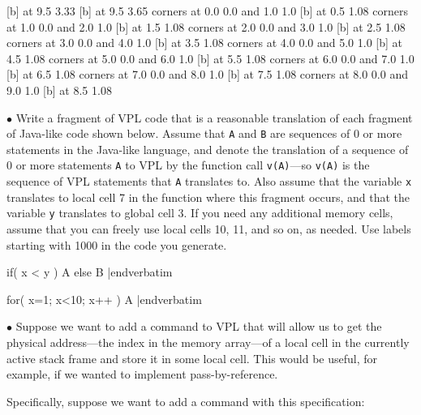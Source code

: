  [b] at 9.5 3.33
 [b] at 9.5 3.65
\putrectangle corners at 0.0 0.0 and 1.0 1.0
 [b] at 0.5 1.08
\putrectangle corners at 1.0 0.0 and 2.0 1.0
 [b] at 1.5 1.08
\putrectangle corners at 2.0 0.0 and 3.0 1.0
 [b] at 2.5 1.08
\putrectangle corners at 3.0 0.0 and 4.0 1.0
 [b] at 3.5 1.08
\putrectangle corners at 4.0 0.0 and 5.0 1.0
 [b] at 4.5 1.08
\putrectangle corners at 5.0 0.0 and 6.0 1.0
 [b] at 5.5 1.08
\putrectangle corners at 6.0 0.0 and 7.0 1.0
 [b] at 6.5 1.08
\putrectangle corners at 7.0 0.0 and 8.0 1.0
 [b] at 7.5 1.08
\putrectangle corners at 8.0 0.0 and 9.0 1.0
 [b] at 8.5 1.08
\endpicture

\vfil\eject

\item{$\bullet$}
Write a fragment of VPL code that is a reasonable translation of each fragment
of Java-like code shown below.  Assume that {\tt A} and {\tt B} are sequences of 0 or
more statements in the Java-like language, and denote the translation of a sequence of 0 or more
statements {\tt A} to VPL by the function call {\tt v(A)}---so {\tt v(A)} is
the sequence of VPL statements that {\tt A} translates to.
Also assume that the variable {\tt x} translates to local cell 7 in the
function where this fragment occurs, and that
the variable {\tt y} translates to global cell 3.
If you need any additional memory cells, assume that you can freely
use local cells
10, 11, and so on, as needed.
Use labels starting with 1000 in the code you generate.
\bigskip

\verbatim
if( x < y )
{
   A
}
else
{
  B
}
|endverbatim

\vfil

\verbatim
for( x=1; x<10; x++ ){
   A
}
|endverbatim

\vfil\eject

\item{$\bullet$}
Suppose we want to add a command to VPL that will allow us to
get the physical address---the index in the memory array---of a local cell
in the currently active stack frame
and store it in some local cell.
This would be useful, for example, if we wanted to implement pass-by-reference.
\medskip

Specifically,
suppose we want to add a command with this specification:

\medskip

